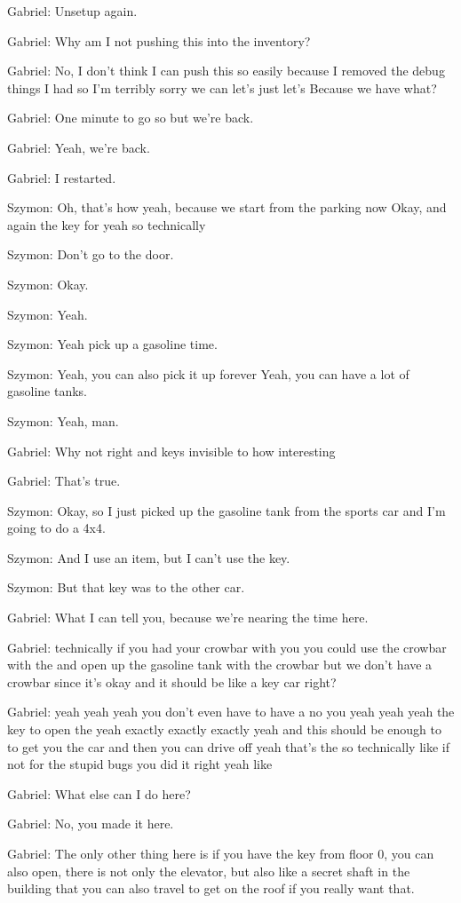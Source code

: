 Gabriel: Unsetup again.

Gabriel: Why am I not pushing this into the inventory?

Gabriel: No, I don't think I can push this so easily because I removed the debug things I had so I'm terribly sorry we can let's just let's Because we have what?

Gabriel: One minute to go so but we're back.

Gabriel: Yeah, we're back.

Gabriel: I restarted.

Szymon: Oh, that's how yeah, because we start from the parking now Okay, and again the key for yeah so technically

Szymon: Don't go to the door.

Szymon: Okay.

Szymon: Yeah.

Szymon: Yeah pick up a gasoline time.

Szymon: Yeah, you can also pick it up forever Yeah, you can have a lot of gasoline tanks.

Szymon: Yeah, man.

Gabriel: Why not right and keys invisible to how interesting

Gabriel: That's true.

Szymon: Okay, so I just picked up the gasoline tank from the sports car and I'm going to do a 4x4.

Szymon: And I use an item, but I can't use the key.

Szymon: But that key was to the other car.

Gabriel: What I can tell you, because we're nearing the time here.

Gabriel: technically if you had your crowbar with you you could use the crowbar with the and open up the gasoline tank with the crowbar but we don't have a crowbar since it's okay and it should be like a key car right?

Gabriel: yeah yeah yeah you don't even have to have a no you yeah yeah yeah the key to open the yeah exactly exactly exactly yeah and this should be enough to to get you the car and then you can drive off yeah that's the so technically like if not for the stupid bugs you did it right yeah like

Gabriel: What else can I do here?

Gabriel: No, you made it here.

Gabriel: The only other thing here is if you have the key from floor 0, you can also open, there is not only the elevator, but also like a secret shaft in the building that you can also travel to get on the roof if you really want that.

